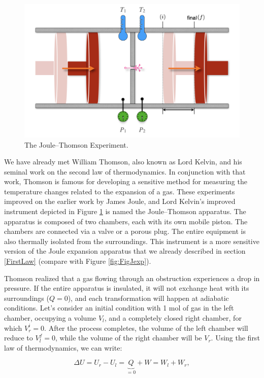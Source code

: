 \documentclass[
  9pt,
]{extbook}
\theoremstyle{definition}
\theoremstyle{definition}
\theoremstyle{definition}
\theoremstyle{definition}
\theoremstyle{remark}
\begin{document}
\begin{figure}

{\centering \includegraphics[width=0.8\linewidth]{./img/OEP_Figures.015} 

}

\caption{The Joule–Thomson Experiment.}\label{fig:FigJT}
\end{figure}

We have already met William Thomson, also known as Lord Kelvin, and his seminal work on the second law of thermodynamics. In conjunction with that work, Thomson is famous for developing a sensitive method for measuring the temperature changes related to the expansion of a gas. These experiments improved on the earlier work by James Joule, and Lord Kelvin's improved instrument depicted in Figure \ref{fig:FigJT} is named the Joule--Thomson apparatus. The apparatus is composed of two chambers, each with its own mobile piston. The chambers are connected via a valve or a porous plug. The entire equipment is also thermally isolated from the surroundings. This instrument is a more sensitive version of the Joule expansion apparatus that we already described in section \ref{FirstLaw} (compare with Figure \ref{fig:FigJexp}).

Thomson realized that a gas flowing through an obstruction experiences a drop in pressure. If the entire apparatus is insulated, it will not exchange heat with its surroundings (\(Q=0\)), and each transformation will happen at adiabatic conditions. Let's consider an initial condition with 1 mol of gas in the left chamber, occupying a volume \(V_l\), and a completely closed right chamber, for which \(V_r^i=0\). After the process completes, the volume of the left chamber will reduce to \(V_l^f=0\), while the volume of the right chamber will be \(V_r\). Using the first law of thermodynamics, we can write:

\begin{equation}
\Delta U=U_r-U_l=\underbrace{Q}_{=0}+W=W_l+W_r,
\label{eq:JT1}
\end{equation}
\end{document}
